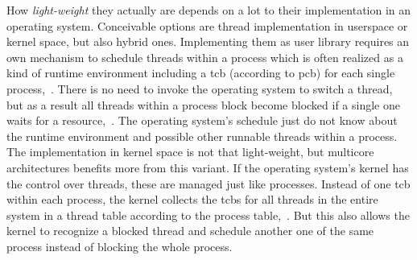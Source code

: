 How \textit{light-weight} they actually are depends on a lot to their implementation in an operating system.
Conceivable options are thread implementation in userspace or kernel space, but also hybrid ones. 
Implementing them as user library requires an own mechanism to schedule threads within a process which is often realized as a kind of runtime environment including a \ac{tcb} (according to \ac{pcb}) for each single process\cite{mandl2014Grundkurs},~\cite{tanenbaum-modern-operating-systems}.
There is no need to invoke the operating system to switch a thread, but as a result all threads within a process block become blocked if a single one waits for a resource\cite{tanenbaum-modern-operating-systems},~\cite{brause2017betriebssysteme}. 
The operating system's schedule just do not know about the runtime environment and possible other runnable threads within a process.
The implementation in kernel space is not that light-weight, but multicore architectures benefits more from this variant.
If the operating system's kernel has the control over threads, these are managed just like processes.
Instead of one \ac{tcb} within each process, the kernel collects the \acp{tcb} for all threads in the entire system in a thread table according to the process table\cite{tanenbaum-modern-operating-systems},~\cite{mandl2014Grundkurs}.
But this also allows the kernel to recognize a blocked thread and schedule another one of the same process instead of blocking the whole process\cite{tanenbaum-modern-operating-systems}.


